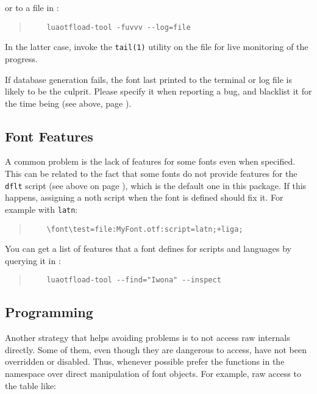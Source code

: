 \noindent or to a file in :

\begin{quote}
  \begin{verbatim}
    luaotfload-tool -fuvvv --log=file
  \end{verbatim}
\end{quote}

\noindent In the latter case, invoke the \verb|tail(1)| utility on the
file for live monitoring of the progress.

If database generation fails, the font last printed to the terminal or
log file is likely to be the culprit.
%
Please specify it when reporting a bug, and blacklist it for the time
being (see above, page \pageref{font-blacklist}).

\subsection {Font Features}

A common problem is the lack of features for some
\OpenType fonts even when specified.
%
This can be related to the fact that some fonts do not provide features
for the \verb|dflt| script (see above on page \pageref{script-tag}),
which is the default one in this package.
%
If this happens, assigning a noth script when the font is defined should
fix it.
%
For example with \verb|latn|:

\begin{quote}
  \begin{verbatim}
    \font\test=file:MyFont.otf:script=latn;+liga;
  \end{verbatim}
\end{quote}

You can get a list of features that a font defines for scripts and
languages by querying it in :

\begin{quote}
  \begin{verbatim}
    luaotfload-tool --find="Iwona" --inspect
  \end{verbatim}
\end{quote}

\subsection {\LUATEX Programming}

Another strategy that helps avoiding problems is to not access raw
\LUATEX internals directly.
%
Some of them, even though they are dangerous to access, have not been
overridden or disabled.
%
Thus, whenever possible prefer the functions in the 
namespace over direct manipulation of font objects. For example, raw
access to the  table like:

